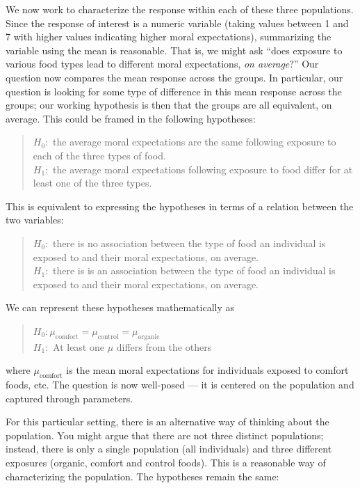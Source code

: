 \documentclass[]{book}
\theoremstyle{definition}
\theoremstyle{definition}
\theoremstyle{remark}
\begin{document}
We now work to characterize the response within each of these three
populations. Since the response of interest is a numeric variable
(taking values between 1 and 7 with higher values indicating higher
moral expectations), summarizing the variable using the mean is
reasonable. That is, we might ask ``does exposure to various food types
lead to different moral expectations, \emph{on average}?'' Our question
now compares the mean response across the groups. In particular, our
question is looking for some type of difference in this mean response
across the groups; our working hypothesis is then that the groups are
all equivalent, on average. This could be framed in the following
hypotheses:

\begin{quote}
\(H_0:\) the average moral expectations are the same following exposure
to each of the three types of food.\\
\(H_1:\) the average moral expectations following exposure to food
differ for at least one of the three types.
\end{quote}

This is equivalent to expressing the hypotheses in terms of a relation
between the two variables:

\begin{quote}
\(H_0:\) there is no association between the type of food an individual
is exposed to and their moral expectations, on average.\\
\(H_1:\) there is is an association between the type of food an
individual is exposed to and their moral expectations, on average.
\end{quote}

We can represent these hypotheses mathematically as

\begin{quote}
\(H_0: \mu_{\text{comfort}} = \mu_{\text{control}} = \mu_{\text{organic}}\)\\
\(H_1:\) At least one \(\mu\) differs from the others
\end{quote}

where \(\mu_{\text{comfort}}\) is the mean moral expectations for
individuals exposed to comfort foods, etc. The question is now
well-posed --- it is centered on the population and captured through
parameters.

For this particular setting, there is an alternative way of thinking
about the population. You might argue that there are not three distinct
populations; instead, there is only a single population (all
individuals) and three different exposures (organic, comfort and control
foods). This is a reasonable way of characterizing the population. The
hypotheses remain the same:
\end{document}
